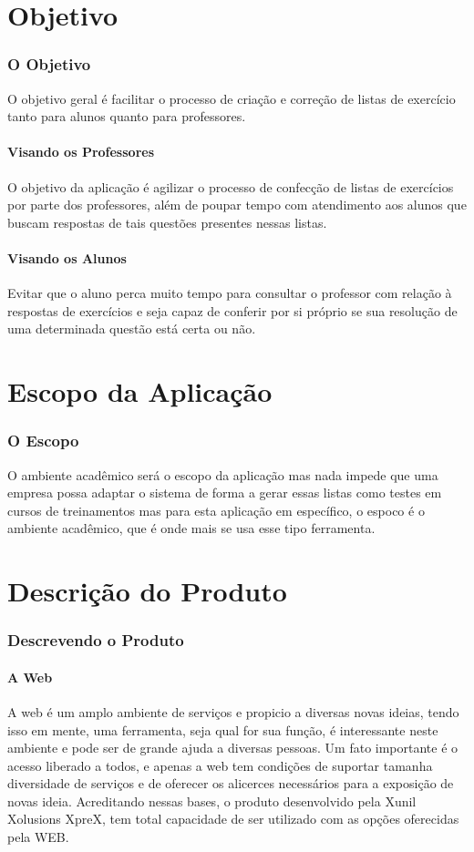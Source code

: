 \documentclass[12pt,oneside,a4paper,article]{abntex2}
\begin{document}
\part{Objetivo}
	\section{O Objetivo}
		O objetivo geral é facilitar o processo de criação e correção de listas de exercício tanto para alunos quanto para professores.
		\subsection{Visando os Professores}
			O objetivo da aplicação é agilizar o processo de confecção de listas de exercícios por parte dos professores, além de poupar tempo com atendimento aos alunos
			que buscam respostas de tais questões presentes nessas listas.

		\subsection{Visando os Alunos}
			Evitar que o aluno perca muito tempo para consultar o professor com relação à respostas de exercícios e seja capaz de conferir por si próprio se sua resolução de
			uma determinada questão está certa ou não.
			
\part{Escopo da Aplicação}
	\section{O Escopo}
		O ambiente acadêmico será o escopo da aplicação mas nada impede que uma empresa possa adaptar o sistema de forma a gerar essas listas como  testes em cursos de
		treinamentos mas para esta aplicação em específico, o espoco é o ambiente acadêmico, que é onde mais se usa esse tipo ferramenta.

\part{Descrição do Produto}
	\section{Descrevendo o Produto}
		
		\subsection{A Web}
			A web é um amplo ambiente de serviços e propicio a diversas novas ideias, tendo isso em mente, uma ferramenta, seja qual for sua função, é interessante neste ambiente e pode ser de grande ajuda a diversas pessoas. Um fato importante é o acesso liberado a todos, e apenas a web tem condições de suportar tamanha diversidade de serviços e de oferecer os alicerces necessários para a exposição de novas ideia. Acreditando nessas bases, o produto desenvolvido pela Xunil Xolusions XpreX, tem total capacidade de ser utilizado com as opções oferecidas pela WEB.
		
\end{document}
